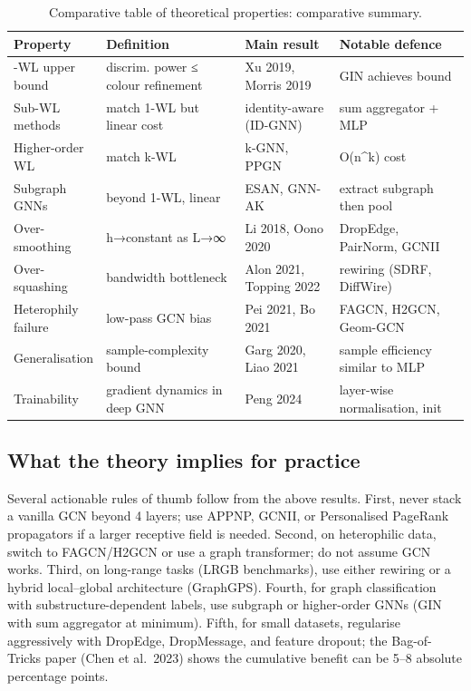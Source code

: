 \documentclass{article}
\begin{document}
\begin{table}[t]
\centering
\caption{Comparative table of theoretical properties: comparative summary.}
\label{tab:comparative-table-of-theoretical-properties}
\begin{tabular}{>{\raggedright\arraybackslash}p{0.1759\linewidth}
  >{\raggedright\arraybackslash}p{0.3148\linewidth}
  >{\raggedright\arraybackslash}p{0.2130\linewidth}
  >{\raggedright\arraybackslash}p{0.2963\linewidth}}
\toprule
Property & Definition & Main result & Notable defence \\
\midrule
1-WL upper bound & discrim. power ≤ colour refinement & Xu 2019, Morris 2019 & GIN achieves bound \\
Sub-WL methods & match 1-WL but linear cost & identity-aware (ID-GNN) & sum aggregator + MLP \\
Higher-order WL & match k-WL & k-GNN, PPGN & O(n\^{}k) cost \\
Subgraph GNNs & beyond 1-WL, linear & ESAN, GNN-AK & extract subgraph then pool \\
Over-smoothing & h→constant as L→∞ & Li 2018, Oono 2020 & DropEdge, PairNorm, GCNII \\
Over-squashing & bandwidth bottleneck & Alon 2021, Topping 2022 & rewiring (SDRF, DiffWire) \\
Heterophily failure & low-pass GCN bias & Pei 2021, Bo 2021 & FAGCN, H2GCN, Geom-GCN \\
Generalisation & sample-complexity bound & Garg 2020, Liao 2021 & sample efficiency similar to MLP \\
Trainability & gradient dynamics in deep GNN & Peng 2024 & layer-wise normalisation, init \\
\end{tabular}
\end{table}

\subsection{What the theory implies for practice}\label{what-the-theory-implies-for-practice}

Several actionable rules of thumb follow from the above results. First, never stack a vanilla GCN beyond 4 layers; use APPNP, GCNII, or Personalised PageRank propagators if a larger receptive field is needed. Second, on heterophilic data, switch to FAGCN/H2GCN or use a graph transformer; do not assume GCN works. Third, on long-range tasks (LRGB benchmarks), use either rewiring or a hybrid local--global architecture (GraphGPS). Fourth, for graph classification with substructure-dependent labels, use subgraph or higher-order GNNs (GIN with sum aggregator at minimum). Fifth, for small datasets, regularise aggressively with DropEdge, DropMessage, and feature dropout; the Bag-of-Tricks paper (Chen et al.~2023) shows the cumulative benefit can be 5--8 absolute percentage points.
\end{document}
